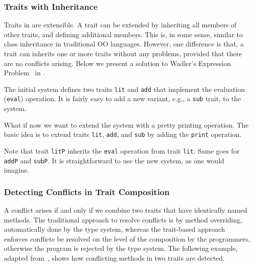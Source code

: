 \subsubsection{Traits with Inheritance}

Traits in \name are extensible. A trait can be extended by inheriting all
members of other traits, and defining additional members. This is, in some
sense, similar to class inheritance in traditional OO languages. However, one
difference is that, a trait can inherits one or more traits without any
problems, provided that there are no conflicts arising. Below we present a
solution to Wadler's Expression Problem~\cite{wadler1998expression} in \name.

The initial system defines two traits \lstinline$lit$ and \lstinline$add$ that
implement the evaluation (\lstinline{eval}) operation. It is fairly easy to add
a new variant, e.g., a \lstinline$sub$ trait, to the system.

What if now we want to extend the system with a pretty printing operation. The
basic idea is to extend traits \lstinline$lit$, \lstinline$add$, and
\lstinline$sub$ by adding the \lstinline$print$ operation.

Note that trait \lstinline$litP$ inherits the \lstinline$eval$ operation from
trait \lstinline$lit$. Same goes for \lstinline$addP$ and \lstinline$subP$. It
is straightforward to use the new system, as one would imagine.


\subsubsection{Detecting Conflicts in Trait Composition}

A conflict arises if and only if we combine two traits that have identically
named methods. The traditional approach to resolve conflicts is by method
overriding, automatically done by the type system, whereas the trait-based
approach enforces conflicts be resolved on the level of the composition by the
programmers, otherwise the program is rejected by the type system. The following
example, adapted from~\cite{alpuimdisjoint}, shows how conflicting methods in
two traits are detected.


